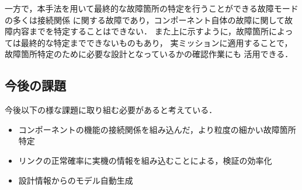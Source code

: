 \documentclass[11pt]{jsarticle}%
\begin{document}
\begin{multicols}{2}
一方で，本手法を用いて最終的な故障箇所の特定を行うことができる故障モードの多くは接続関係
に関する故障であり，コンポーネント自体の故障に関して故障内容までを特定することはできない．
また上に示すように，故障箇所によっては最終的な特定までできないものもあり，
実ミッションに適用することで，故障箇所特定のために必要な設計となっているかの確認作業にも
活用できる．

\subsection{今後の課題}
今後以下の様な課題に取り組む必要があると考えている．
\begin{itemize}
  \item コンポーネントの機能の接続関係を組み込んだ，より粒度の細かい故障箇所特定
  \item リンクの正常確率に実機の情報を組み込むことによる，検証の効率化
  \item 設計情報からのモデル自動生成
\end{itemize}

  
   

\end{multicols}
\end{document}
